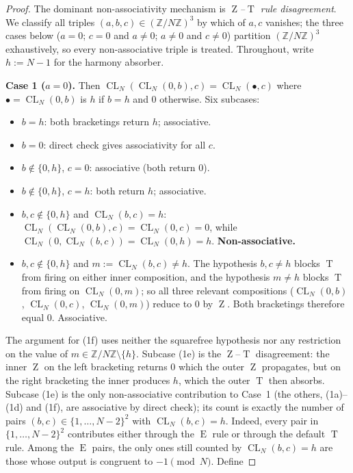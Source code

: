 \documentclass[11pt,reqno]{amsart}
\theoremstyle{plain}
\theoremstyle{definition}
\theoremstyle{remark}
\DeclareMathOperator{\CL}{CL}
\DeclareMathOperator{\ECHO}{E}
\DeclareMathOperator{\HARM}{T}
\DeclareMathOperator{\VOID}{Z}
\newcommand{\ZN}{\mathbb{Z}/N\mathbb{Z}}
\begin{document}
\begin{proof}
The dominant non-associativity mechanism is \emph{$\VOID$--$\HARM$ rule
disagreement}. We classify all triples
$(a,b,c)\in(\ZN)^{3}$ by which of $a,c$ vanishes; the three cases
below ($a=0$; $c=0$ and $a\neq 0$; $a\neq 0$ and $c\neq 0$) partition
$(\ZN)^{3}$ exhaustively, so every non-associative triple is treated.
Throughout, write $h:=N-1$ for the harmony absorber.

\medskip
\noindent\textbf{Case 1 ($a=0$).} Then
$\CL_N(\CL_N(0,b),c)=\CL_N(\bullet,c)$ where
$\bullet=\CL_N(0,b)$ is $h$ if $b=h$ and $0$ otherwise. Six subcases:
\begin{itemize}\setlength\itemsep{0pt}
\item[(1a)] $b=h$: both bracketings return $h$; associative.
\item[(1b)] $b=0$: direct check gives associativity for all $c$.
\item[(1c)] $b\notin\{0,h\}$, $c=0$: associative (both return $0$).
\item[(1d)] $b\notin\{0,h\}$, $c=h$: both return $h$; associative.
\item[(1e)] $b,c\notin\{0,h\}$ and $\CL_N(b,c)=h$:
  $\CL_N(\CL_N(0,b),c)=\CL_N(0,c)=0$, while
  $\CL_N(0,\CL_N(b,c))=\CL_N(0,h)=h$. \textbf{Non-associative.}
\item[(1f)] $b,c\notin\{0,h\}$ and $m := \CL_N(b,c) \neq h$. The
  hypothesis $b,c \neq h$ blocks $\HARM$ from firing on either inner
  composition, and the hypothesis $m \neq h$ blocks $\HARM$ from
  firing on $\CL_N(0,m)$; so all three relevant compositions
  ($\CL_N(0,b)$, $\CL_N(0,c)$, $\CL_N(0,m)$) reduce to $0$ by
  $\VOID$. Both bracketings therefore equal $0$. Associative.
\end{itemize}
The argument for (1f) uses neither the squarefree hypothesis nor any
restriction on the value of $m\in\ZN\setminus\{h\}$.
Subcase (1e) is the $\VOID$--$\HARM$ disagreement: the inner $\VOID$
on the left bracketing returns $0$ which the outer $\VOID$ propagates,
but on the right bracketing the inner produces $h$, which the outer
$\HARM$ then absorbs. Subcase (1e) is the only non-associative
contribution to Case~1 (the others, (1a)--(1d) and (1f), are
associative by direct check); its count is exactly the number of
pairs $(b,c)\in\{1,\dots,N-2\}^{2}$ with $\CL_N(b,c)=h$. Indeed,
every pair in $\{1,\dots,N-2\}^{2}$ contributes either through the
$\ECHO$ rule or through the default $\HARM$ rule. Among the
$\ECHO$ pairs, the only ones still counted by $\CL_N(b,c)=h$ are
those whose output is congruent to $-1\pmod N$. Define

\end{proof}
\end{document}
